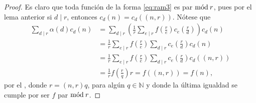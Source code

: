 \begin{proof}
Es claro que toda función de la forma \eqref{eq:ram3} es par $\mathrm{m\acute{o}d\:}r$, pues por el lema anterior si $d \mid r$, entonces $c_d(n)=c_d((n,r))$. Nótese que
\begin{equation*}
\begin{split}
    \sum_{d \mid r} \alpha(d) c_d(n) &= \sum_{d \mid r} \left( \frac{1}{r} \sum_{e \mid r} f \left( \frac{r}{e} \right) c_e \left( \frac{r}{d} \right) \right) c_d(n) \\
                                     &= \frac{1}{r} \sum_{e \mid r} f \left( \frac{r}{e} \right) \sum_{d \mid r} c_e \left( \frac{r}{d} \right) c_d(n) \\
                                     &= \frac{1}{r} \sum_{e \mid r} f \left( \frac{r}{e} \right) \sum_{d \mid r} c_e \left( \frac{r}{d} \right) c_d((n,r)) \\
                                     &= \frac{1}{r} f \left( \frac{r}{q} \right) r = f((n,r)) = f(n),
\end{split}
\end{equation*}
por el , donde $r=(n,r) q$, para algún $q \in \mathbb{N}$ y donde la última igualdad se cumple por ser $f$ par $\mathrm{m\acute{o}d\:}r$.
\bigskip


\end{proof}

